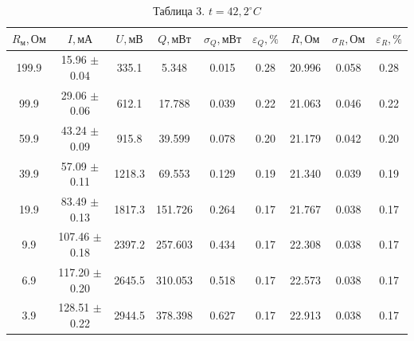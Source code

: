 \documentclass[a4paper]{article}
\begin{document}
\begin{enumerate}
\begin{table}[h!]
    \centering
    \begin{tabular}{|*{9}{c|}}
\hline
        $R_\text{м}, \text{Ом}$ & $I, \text{мА}$ & $U, \text{мВ}$ & $Q, \text{мВт}$ & $\sigma_Q, \text{мВт}$ & $\varepsilon_Q, \%$ & $R, \text{Ом}$ & $\sigma_R,  \text{Ом}$ & $\varepsilon_R, \%$ \\ \hline
        199.9  & 15.96 $\pm$ 0.04 & 335.1  & 5.348  & 0.015  & 0.28  & 20.996  & 0.058  & 0.28 \\ \hline
        99.9   & 29.06 $\pm$ 0.06 & 612.1  & 17.788 & 0.039  & 0.22  & 21.063  & 0.046  & 0.22 \\ \hline
        59.9   & 43.24 $\pm$ 0.09 & 915.8  & 39.599 & 0.078  & 0.20  & 21.179  & 0.042  & 0.20 \\ \hline
        39.9   & 57.09 $\pm$ 0.11 & 1218.3 & 69.553 & 0.129  & 0.19  & 21.340  & 0.039  & 0.19 \\ \hline
        19.9   & 83.49 $\pm$ 0.13 & 1817.3 & 151.726 & 0.264  & 0.17  & 21.767  & 0.038  & 0.17 \\ \hline
        9.9    & 107.46 $\pm$ 0.18 & 2397.2 & 257.603 & 0.434  & 0.17  & 22.308  & 0.038  & 0.17 \\ \hline
        6.9    & 117.20 $\pm$ 0.20 & 2645.5 & 310.053 & 0.518  & 0.17  & 22.573  & 0.038  & 0.17 \\ \hline
        3.9    & 128.51 $\pm$ 0.22 & 2944.5 & 378.398 & 0.627  & 0.17  & 22.913  & 0.038  & 0.17 \\ \hline
    \end{tabular}
    \caption{Таблица 3. $t = 42,2 ^\circ C$}
\end{table}


\end{enumerate}
\end{document}
